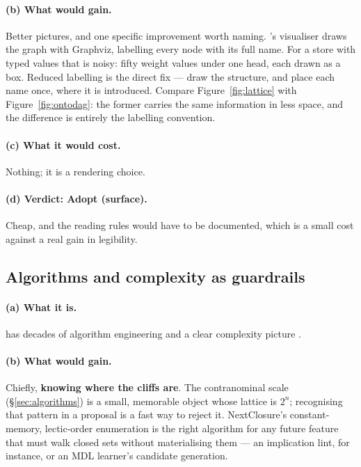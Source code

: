 \paragraph{(b) What \odag{} would gain.} Better pictures, and one specific
improvement worth naming. \odag{}'s visualiser draws the graph with Graphviz,
labelling every node with its full name. For a store with typed values that is
noisy: fifty weight values under one head, each drawn as a box. Reduced
labelling is the direct fix --- draw the structure, and place each name once,
where it is introduced. Compare Figure~\ref{fig:lattice} with
Figure~\ref{fig:ontodag}: the former carries the same information in less
space, and the difference is entirely the labelling convention.

\paragraph{(c) What it would cost.} Nothing; it is a rendering choice.

\paragraph{(d) Verdict: \textbf{Adopt (surface)}.} Cheap, and the reading
rules would have to be documented, which is a small cost against a real gain
in legibility.

\subsection{Algorithms and complexity as guardrails}
\label{sec:learn-complexity}

\paragraph{(a) What it is.} \fca{} has decades of algorithm engineering
\citep{kuznetsov2002,krajca2010,lindig2000} and a clear complexity picture
\citep{kuznetsov2001}.

\paragraph{(b) What \odag{} would gain.} Chiefly, \textbf{knowing where the
cliffs are}. The contranominal scale (\S\ref{sec:algorithms}) is a small,
memorable object whose lattice is $2^n$; recognising that pattern in a
proposal is a fast way to reject it. NextClosure's constant-memory,
lectic-order enumeration is the right algorithm for any future \odag{} feature
that must walk closed sets without materialising them --- an
implication lint, for instance, or an MDL learner's candidate generation.


